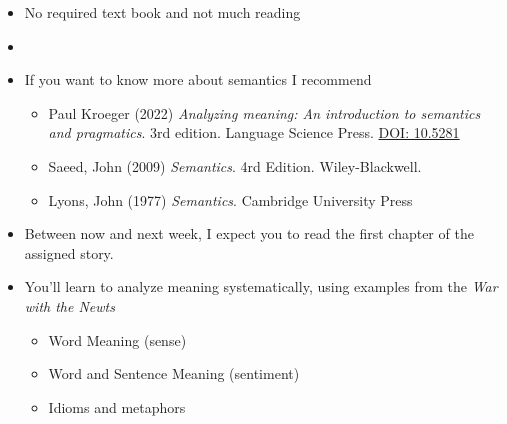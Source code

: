 \documentclass[a4paper,landscape,headrule,footrule,xetex,25pt]{foils}
\begin{document}
\begin{itemize}
\item No required text book and not much reading
\item {}
\item If you want to know more about semantics I recommend
  \begin{itemize}
  \item Paul Kroeger (2022) \textit{Analyzing meaning: An introduction to semantics and pragmatics}. 3rd edition.  Language Science Press. \href{https://langsci-press.org/catalog/book/359}{DOI: 10.5281}
  \item Saeed, John (2009) \textit{Semantics}. 4rd Edition. Wiley-Blackwell. 
  \item Lyons, John (1977) \textit{Semantics}.  Cambridge University Press
  \end{itemize}
\item Between now and next week, I expect you to read the first chapter of the assigned story.
\end{itemize}


\begin{itemize}
\item You'll learn to analyze meaning systematically, using examples from the \textit{War with the Newts}
  \begin{itemize}
  \item Word Meaning (sense)
    \\  
  \item Word and Sentence Meaning (sentiment)
    \\  
  \item Idioms and metaphors
    \\ 
  \end{itemize}

\end{itemize}




\end{document}
